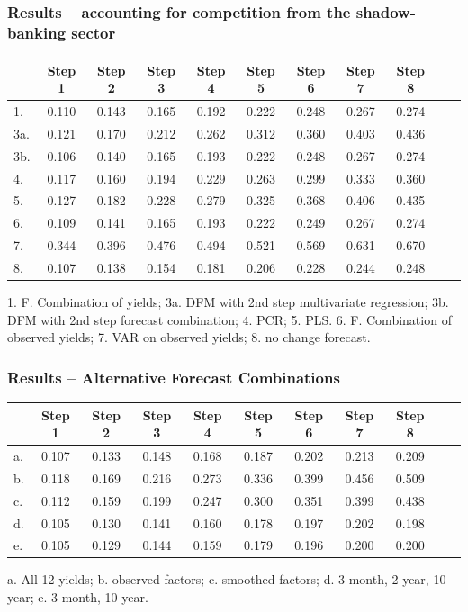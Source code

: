 \documentclass[handout]{beamer}
\begin{document}
\begin{frame}
\frametitle{Results -- accounting for competition from the shadow-banking sector}
\footnotesize
\begin{table}
\center
\begin{tabular}{|l|c|c|c|c|c|c|c|c|c|c|}
\hline
&Step 1 &Step 2 &Step 3 &Step 4 &Step 5 &Step 6 &Step 7 &Step 8 \\
\hline
1.   &0.110&0.143&0.165&0.192&0.222&0.248&0.267&0.274\\
3a. &0.121&0.170&0.212&0.262&0.312&0.360&0.403&0.436\\
3b. &0.106&0.140&0.165&0.193&0.222&0.248&0.267&0.274\\
4.   &0.117&0.160&0.194&0.229&0.263&0.299&0.333&0.360\\
5.   &0.127&0.182&0.228&0.279&0.325&0.368&0.406&0.435\\
6.   &0.109&0.141&0.165&0.193&0.222&0.249&0.267&0.274\\
7.   &0.344&0.396&0.476&0.494&0.521&0.569&0.631&0.670\\
8.   &0.107&0.138&0.154&0.181&0.206&0.228&0.244&0.248\\
\hline
\end{tabular}
\end{table}
1. F. Combination of yields; 3a. DFM with 2nd step multivariate regression; 3b. DFM with 2nd step forecast combination; 4. PCR; 5. PLS. 6. F. Combination of observed yields; 7. VAR on observed yields; 8. no change forecast.
\end{frame}

\begin{frame}
\frametitle{Results -- Alternative Forecast Combinations}
\footnotesize
\begin{table}
\center
\begin{tabular}{|l|c|c|c|c|c|c|c|c|c|c|}
\hline
&Step 1 &Step 2 &Step 3 &Step 4 &Step 5 &Step 6 &Step 7 &Step 8 \\
\hline
a.  &0.107&0.133&0.148&0.168&0.187&0.202&0.213&0.209\\
b.  &0.118&0.169&0.216&0.273&0.336&0.399&0.456&0.509\\
c.  &0.112&0.159&0.199&0.247&0.300&0.351&0.399&0.438\\
d.  &0.105&0.130&0.141&0.160&0.178&0.197&0.202&0.198\\
e.  &0.105&0.129&0.144&0.159&0.179&0.196&0.200&0.200\\
\hline
\end{tabular}
\end{table}
a. All 12 yields; b. observed factors; c. smoothed factors; d. 3-month, 2-year, 10-year;  e. 3-month, 10-year.
\end{frame}
\end{document}

